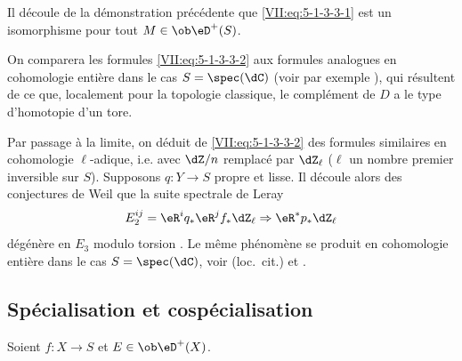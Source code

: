 Il découle de la démonstration précédente que \eqref{VII:eq:5-1-3-3-1} 
est un isomorphisme pour tout $M\in\ob\eD^+(S)$. 

On comparera les formules \eqref{VII:eq:5-1-3-3-2} aux formules analogues en 
cohomologie entière dans le \mbox{cas} $S=\spec(\dC)$ (voir par exemple 
), qui résultent de ce que, localement pour la topologie 
classique, le complément de $D$ a le type d'homotopie d'un tore. 

Par passage à la limite, on déduit de \eqref{VII:eq:5-1-3-3-2} des formules 
similaires en cohomologie $\ell$-adique, i.e. avec $\dZ/n$ remplacé par 
$\dZ_\ell$ ($\ell$ un nombre premier inversible sur $S$). Supposons 
$q:Y\to S$ propre et lisse. Il découle alors des conjectures de Weil 
 que la suite spectrale de Leray 
\[
  E_2^{i j} = \eR^i q_\ast \eR^j f_\ast \dZ_\ell \Rightarrow \eR^\ast p_\ast \dZ_\ell 
\]
dégénère en $E_3$ modulo torsion . Le même 
phénomène se produit en cohomologie entière dans le cas 
$S=\spec(\dC)$, voir (loc.\ cit.) et . 





\subsection{Spécialisation et cospécialisation}\label{VII:5-2}

Soient $f:X\to S$ et $E\in\ob\eD^+(X)$. 





\subsubsection{}\label{VII:5-2-1}

